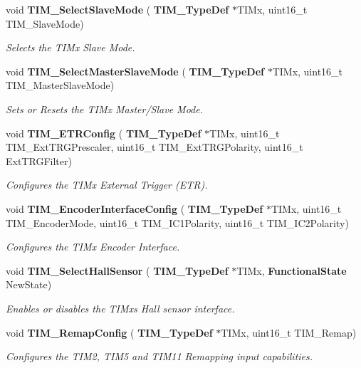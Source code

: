 \begin{DoxyCompactItemize}
void \textbf{ T\+I\+M\+\_\+\+Select\+Slave\+Mode} (\textbf{ T\+I\+M\+\_\+\+Type\+Def} $\ast$T\+I\+Mx, uint16\+\_\+t T\+I\+M\+\_\+\+Slave\+Mode)
\begin{DoxyCompactList}\small\item\em Selects the T\+I\+Mx Slave Mode. \end{DoxyCompactList}\item 
void \textbf{ T\+I\+M\+\_\+\+Select\+Master\+Slave\+Mode} (\textbf{ T\+I\+M\+\_\+\+Type\+Def} $\ast$T\+I\+Mx, uint16\+\_\+t T\+I\+M\+\_\+\+Master\+Slave\+Mode)
\begin{DoxyCompactList}\small\item\em Sets or Resets the T\+I\+Mx Master/\+Slave Mode. \end{DoxyCompactList}\item 
void \textbf{ T\+I\+M\+\_\+\+E\+T\+R\+Config} (\textbf{ T\+I\+M\+\_\+\+Type\+Def} $\ast$T\+I\+Mx, uint16\+\_\+t T\+I\+M\+\_\+\+Ext\+T\+R\+G\+Prescaler, uint16\+\_\+t T\+I\+M\+\_\+\+Ext\+T\+R\+G\+Polarity, uint16\+\_\+t Ext\+T\+R\+G\+Filter)
\begin{DoxyCompactList}\small\item\em Configures the T\+I\+Mx External Trigger (E\+TR). \end{DoxyCompactList}\item 
void \textbf{ T\+I\+M\+\_\+\+Encoder\+Interface\+Config} (\textbf{ T\+I\+M\+\_\+\+Type\+Def} $\ast$T\+I\+Mx, uint16\+\_\+t T\+I\+M\+\_\+\+Encoder\+Mode, uint16\+\_\+t T\+I\+M\+\_\+\+I\+C1\+Polarity, uint16\+\_\+t T\+I\+M\+\_\+\+I\+C2\+Polarity)
\begin{DoxyCompactList}\small\item\em Configures the T\+I\+Mx Encoder Interface. \end{DoxyCompactList}\item 
void \textbf{ T\+I\+M\+\_\+\+Select\+Hall\+Sensor} (\textbf{ T\+I\+M\+\_\+\+Type\+Def} $\ast$T\+I\+Mx, \textbf{ Functional\+State} New\+State)
\begin{DoxyCompactList}\small\item\em Enables or disables the T\+I\+Mx\textquotesingle{}s Hall sensor interface. \end{DoxyCompactList}\item 
void \textbf{ T\+I\+M\+\_\+\+Remap\+Config} (\textbf{ T\+I\+M\+\_\+\+Type\+Def} $\ast$T\+I\+Mx, uint16\+\_\+t T\+I\+M\+\_\+\+Remap)
\begin{DoxyCompactList}\small\item\em Configures the T\+I\+M2, T\+I\+M5 and T\+I\+M11 Remapping input capabilities. \end{DoxyCompactList}\end{DoxyCompactItemize}



